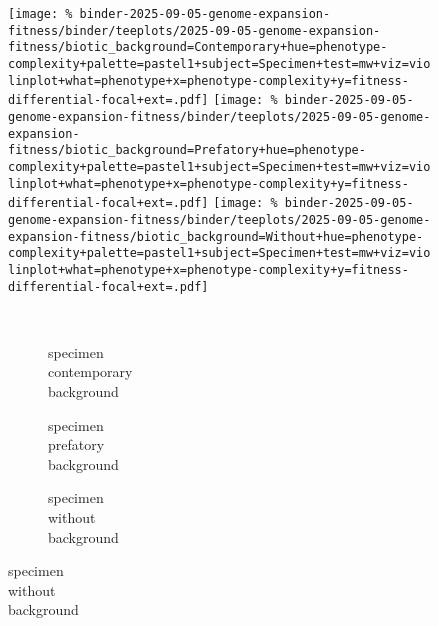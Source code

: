 \begin{figure}

\begin{minipage}{\linewidth}
\texttt{[image: \%
binder-2025-09-05-genome-expansion-fitness/binder/teeplots/2025-09-05-genome-expansion-fitness/biotic\_background=Contemporary+hue=phenotype-complexity+palette=pastel1+subject=Specimen+test=mw+viz=violinplot+what=phenotype+x=phenotype-complexity+y=fitness-differential-focal+ext=.pdf]}
\texttt{[image: \%
binder-2025-09-05-genome-expansion-fitness/binder/teeplots/2025-09-05-genome-expansion-fitness/biotic\_background=Prefatory+hue=phenotype-complexity+palette=pastel1+subject=Specimen+test=mw+viz=violinplot+what=phenotype+x=phenotype-complexity+y=fitness-differential-focal+ext=.pdf]}%
\texttt{[image: \%
binder-2025-09-05-genome-expansion-fitness/binder/teeplots/2025-09-05-genome-expansion-fitness/biotic\_background=Without+hue=phenotype-complexity+palette=pastel1+subject=Specimen+test=mw+viz=violinplot+what=phenotype+x=phenotype-complexity+y=fitness-differential-focal+ext=.pdf]}

\vspace{-1ex}

\begin{subfigure}{0.135\linewidth}
~
\end{subfigure}%
\begin{subfigure}{0.305\linewidth}
    \centering
    \caption{\footnotesize specimen\\contemporary\\background}
    \label{fig:fitness-pcomplexity:specimen-contemporary}
\end{subfigure}%
\begin{subfigure}{0.305\linewidth}
    \centering
    \caption{\footnotesize specimen\\prefatory\\background}
    \label{fig:fitness-pcomplexity:specimen-prefatory}
\end{subfigure}%
\begin{subfigure}{0.255\linewidth}
    \centering
    \caption{\footnotesize specimen\\without\\background}
    \label{fig:fitness-pcomplexity:specimen-without}
\end{subfigure}
\end{minipage}


\end{figure}

